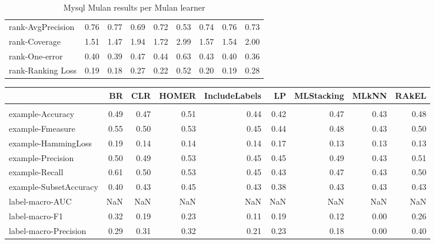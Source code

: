 \documentclass{acm_proc_article-sp}
\begin{document}
\begin{table*}
\begin{tabular}{l|rrrrrrrr}
rank-AvgPrecision & 0.76 & 0.77 & 0.69 & 0.72 & 0.53 & 0.74 & 0.76 & 0.73 \\

rank-Coverage & 1.51 & 1.47 & 1.94 & 1.72 & 2.99 & 1.57 & 1.54 & 2.00 \\

rank-One-error & 0.40 & 0.39 & 0.47 & 0.44 & 0.63 & 0.43 & 0.40 & 0.36 \\

rank-Ranking Loss & 0.19 & 0.18 & 0.27 & 0.22 & 0.52 & 0.20 & 0.19 & 0.28 \\

\end{tabular}
\caption{Mysql Mulan results per Mulan learner}
\end{table*}


\begin{table*}
\begin{tabular}{l|rrrrrrrr}

  & BR & CLR & HOMER & IncludeLabels & LP & MLStacking & MLkNN & RAkEL \\

\hline \\

example-Accuracy & 0.49 & 0.47 & 0.51 & 0.44 & 0.42 & 0.47 & 0.43 & 0.48 \\

example-Fmeasure & 0.55 & 0.50 & 0.53 & 0.45 & 0.44 & 0.48 & 0.43 & 0.50 \\

example-HammingLoss & 0.19 & 0.14 & 0.14 & 0.14 & 0.17 & 0.13 & 0.13 & 0.13 \\

example-Precision & 0.50 & 0.49 & 0.53 & 0.45 & 0.45 & 0.49 & 0.43 & 0.51 \\

example-Recall & 0.61 & 0.50 & 0.53 & 0.45 & 0.43 & 0.47 & 0.43 & 0.50 \\

example-SubsetAccuracy & 0.40 & 0.43 & 0.45 & 0.43 & 0.38 & 0.43 & 0.43 & 0.43 \\

label-macro-AUC & NaN & NaN & NaN & NaN & NaN & NaN & NaN & NaN \\

label-macro-F1 & 0.32 & 0.19 & 0.23 & 0.11 & 0.19 & 0.12 & 0.00 & 0.26 \\

label-macro-Precision & 0.29 & 0.31 & 0.32 & 0.21 & 0.23 & 0.18 & 0.00 & 0.40 \\


\end{tabular}
\end{table*}
\end{document}
